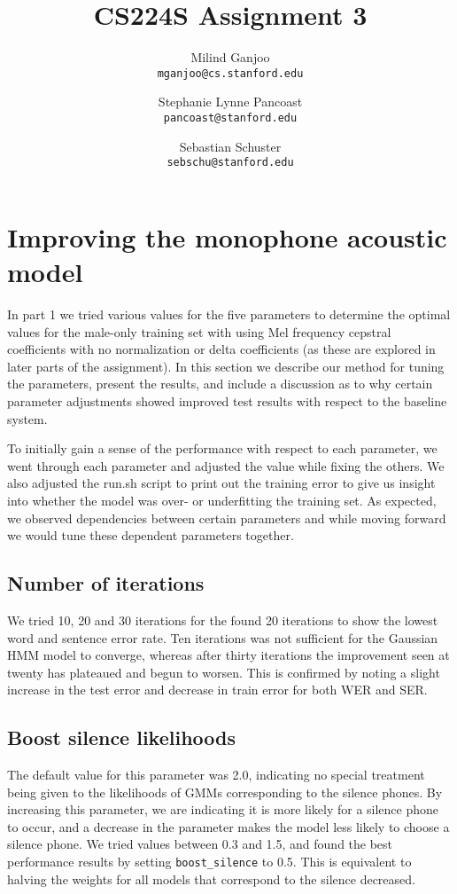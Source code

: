 \documentclass[11pt]{article}
\title{CS224S Assignment 3}
\author{Milind Ganjoo\\\texttt{mganjoo@cs.stanford.edu}
\and%
Stephanie Lynne Pancoast\\\texttt{pancoast@stanford.edu}
\and%
Sebastian Schuster\\\texttt{sebschu@stanford.edu}}
\date{}
\begin{document}
\maketitle
\section{Improving the monophone acoustic model}

In part 1 we tried various values for the five parameters to determine the
optimal values for the male-only training set with using Mel frequency
cepstral coefficients with no normalization or delta coefficients (as these
are explored in later parts of the assignment). In this section we describe
our method for tuning the parameters, present the results, and include a
discussion as to why certain parameter adjustments showed improved test
results with respect to the baseline system.

To initially gain a sense of the performance with respect to each parameter,
we went through each parameter and adjusted the value while fixing the others.
We also adjusted the run.sh script to print out the training error to give us
insight into whether the model was over- or underfitting the training set. As
expected, we observed dependencies between certain parameters and while moving
forward we would tune these dependent parameters together.

\subsection{Number of iterations}
We tried 10, 20 and 30 iterations for the found 20 iterations to show the
lowest word and sentence error rate. Ten iterations was not sufficient for the
Gaussian HMM model to converge, whereas after thirty iterations the
improvement seen at twenty has plateaued and begun to worsen. This is
confirmed by noting a slight increase in the test error and decrease in train
error for both WER and SER.\@

\subsection{Boost silence likelihoods}
The default value for this parameter was 2.0, indicating no special treatment
being given to the likelihoods of GMMs corresponding to the silence phones. By
increasing this parameter, we are indicating it is more likely for a silence
phone to occur, and a decrease in the parameter makes the model less likely to
choose a silence phone. We tried values between 0.3 and 1.5, and found the
best performance results by setting \texttt{boost\_silence} to 0.5. This is equivalent
to halving the weights for all models that correspond to the silence
decreased.
\end{document}

